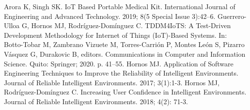\documentclass{IOS-Book-Article}
\begin{document}
\begin{thebibliography}{99}
Arora K, Singh SK. IoT Based Portable Medical Kit. International Journal of Engineering and Advanced Technology. 2019; 8(5 Special Issue 3):42–6.
Guerrero-Ulloa G, Hornos MJ, Rodríguez-Domínguez C. TDDM4IoTS: A Test-Driven Development Methodology for Internet of Things (IoT)-Based Systems. In: Botto-Tobar M, Zambrano Vizuete M, Torres-Carrión P, Montes León S, Pizarro Vásquez G, Durakovic B, editors. Communications in Computer and Information Science. Quito: Springer; 2020. p. 41–55.
Hornos MJ. Application of Software Engineering Techniques to Improve the Reliability of Intelligent Environments. Journal of Reliable Intelligent Environments. 2017; 3(1):1-3.
Hornos MJ, Rodríguez-Domínguez C. Increasing User Confidence in Intelligent Environments. Journal of Reliable Intelligent Environments. 2018; 4(2): 71-3.
\end{thebibliography}
\end{document}

